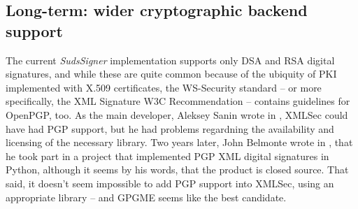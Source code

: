 \subsection{Long-term: wider cryptographic backend support}

The current \emph{SudsSigner} implementation supports only DSA and RSA digital signatures, and while these are quite common because of the ubiquity of PKI implemented with X.509 certificates, the WS\hyp{}Security standard -- or more specifically, the XML Signature W3C Recommendation -- contains guidelines for OpenPGP, too. As the main developer, Aleksey Sanin wrote in \cite{aleksey-pgp-mail}, XMLSec could have had PGP support, but he had problems regardning the availability and licensing of the necessary library. Two years later, John Belmonte wrote in \cite{belmonte-pgp-mail}, that he took part in a project that implemented PGP XML digital signatures in Python, although it seems by his words, that the product is closed source. That said, it doesn't seem impossible to add PGP support into XMLSec, using an appropriate library -- and GPGME \cite{gpgme-homepage} seems like the best candidate.
